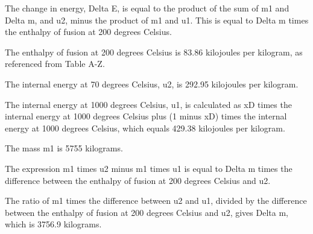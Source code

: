 The change in energy, Delta E, is equal to the product of the sum of m1 and Delta m, and u2, minus the product of m1 and u1. This is equal to Delta m times the enthalpy of fusion at 200 degrees Celsius.

The enthalpy of fusion at 200 degrees Celsius is 83.86 kilojoules per kilogram, as referenced from Table A-Z.

The internal energy at 70 degrees Celsius, u2, is 292.95 kilojoules per kilogram.

The internal energy at 1000 degrees Celsius, u1, is calculated as xD times the internal energy at 1000 degrees Celsius plus (1 minus xD) times the internal energy at 1000 degrees Celsius, which equals 429.38 kilojoules per kilogram.

The mass m1 is 5755 kilograms.

The expression m1 times u2 minus m1 times u1 is equal to Delta m times the difference between the enthalpy of fusion at 200 degrees Celsius and u2.

The ratio of m1 times the difference between u2 and u1, divided by the difference between the enthalpy of fusion at 200 degrees Celsius and u2, gives Delta m, which is 3756.9 kilograms.